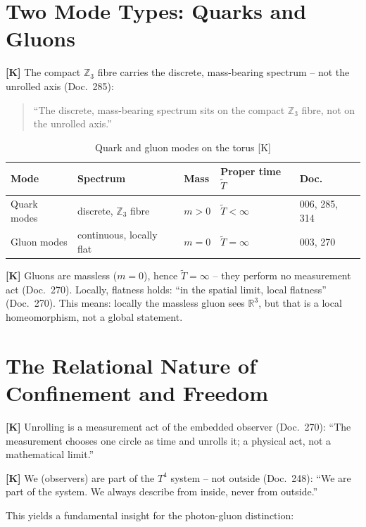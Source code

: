 \section{Two Mode Types: Quarks and Gluons}

\textbf{[K]} The compact $\mathbb{Z}_3$ fibre carries the discrete,
mass-bearing spectrum -- not the unrolled axis (Doc.~285):
\begin{quote}
``The discrete, mass-bearing spectrum sits on the compact
$\mathbb{Z}_3$ fibre, not on the unrolled axis.''
\end{quote}

\begin{table}[h]
\centering
\caption{Quark and gluon modes on the torus [K]}
\begin{tabular}{lllll}
\toprule
Mode & Spectrum & Mass & Proper time $\tilde{T}$ & Doc. \\
\midrule
Quark modes & discrete, $\mathbb{Z}_3$ fibre
  & $m > 0$ & $\tilde{T} < \infty$ & 006, 285, 314 \\
Gluon modes & continuous, locally flat
  & $m = 0$ & $\tilde{T} = \infty$ & 003, 270 \\
\bottomrule
\end{tabular}
\end{table}

\textbf{[K]} Gluons are massless ($m = 0$), hence $\tilde{T} = \infty$
-- they perform no measurement act (Doc.~270). Locally, flatness holds:
``in the spatial limit, local flatness'' (Doc.~270). This means: locally
the massless gluon sees $\mathbb{R}^3$, but that is a local
homeomorphism, not a global statement.

\section{The Relational Nature of Confinement and Freedom}

\textbf{[K]} Unrolling is a measurement act of the embedded observer
(Doc.~270): ``The measurement chooses one circle as time and unrolls
it; a physical act, not a mathematical limit.''

\textbf{[K]} We (observers) are part of the $T^4$ system -- not outside
(Doc.~248): ``We are part of the system. We always describe from inside,
never from outside.''

This yields a fundamental insight for the photon-gluon distinction:

